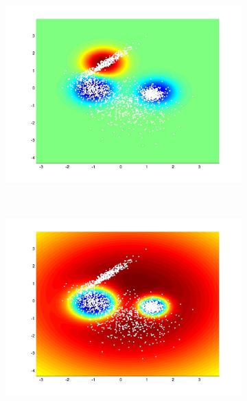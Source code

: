 \documentclass[useAMS,usenatbib,fleqn]{mn2e}
\begin{document}
\begin{figure}
         \begin{subfigure}[b]{90 px}
                \includegraphics[trim = 150px 100px 150px 70px, clip=true,width=\textwidth]{global3.jpg}
        \end{subfigure}
        ~
         \begin{subfigure}[b]{90 px}
                \includegraphics[trim = 150px 100px 150px 70px, clip=true,width=\textwidth]{VL3.jpg}
        \end{subfigure}
        ~
        \begin{subfigure}[b]{90 px}

\end{subfigure}
\end{figure}
\end{document}
